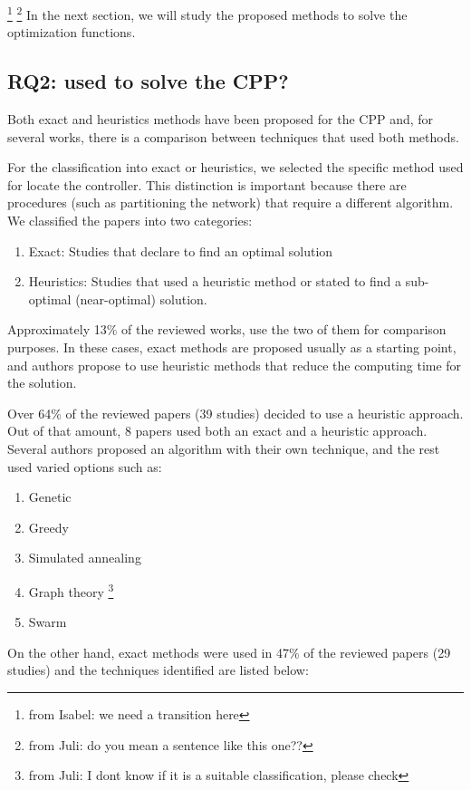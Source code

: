 \documentclass{IEEEtran}
\newcommand\fia[1]{{\color{red}\footnote{\color{red}from Isabel: #1}}} %
\newcommand\juli[1]{{\color{magenta}\footnote{\color{magenta}from Juli: #1}}}
\newcommand\mia[1]{{\color{red}#1}}%
\begin{document}
\fia{we need a transition here} \juli{do you mean a sentence like this one??}
In the next section, we will study the proposed methods to solve the optimization functions.


\subsection{RQ2:  used to solve the CPP?}

Both exact and heuristics methods have been proposed for the CPP and, for several works, there is a comparison between techniques that used both methods. 

For the classification into exact or heuristics, we selected the specific method used for locate the controller. This distinction is important because there are procedures (such as partitioning the network) that require a different algorithm. 
We classified the papers into two categories:
\begin{enumerate}
    \item Exact: Studies that declare to find an optimal solution
    \item Heuristics: Studies that used a heuristic method or stated to find a sub-optimal (near-optimal) solution.
\end{enumerate}

Approximately 13\% of the \mia{reviewed} works, use the two of them for comparison purposes. In these cases, exact methods are proposed usually as a starting point, and authors propose to use heuristic methods that reduce the computing time for the solution. 

Over 64\% of the reviewed papers (39 studies) decided to use a heuristic approach. Out of that amount, 8 papers used both an exact and a heuristic approach. 
Several authors proposed an algorithm with their own technique, and the rest used varied options such as:
\begin{enumerate}
    \item Genetic
    \item Greedy
    \item Simulated annealing
    \item Graph theory \juli{I dont know if it is a suitable classification, please check}
    \item Swarm 
\end{enumerate}

On the other hand, exact methods were used in 47\% of the reviewed papers (29 studies) and the techniques identified are listed below:
\end{document}
